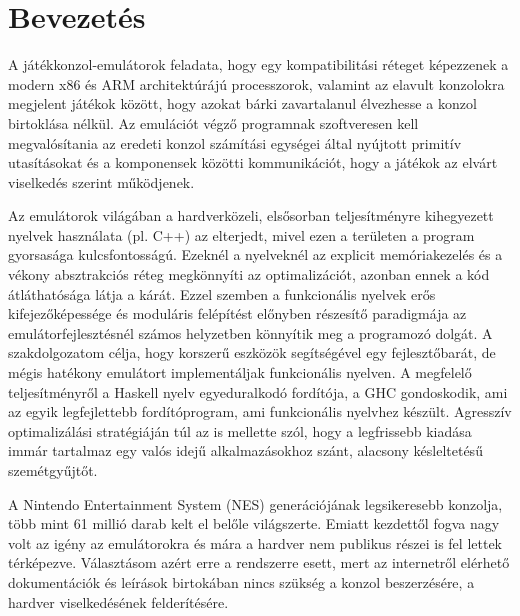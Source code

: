 \chapter{Bevezetés} %
\label{ch:intro}


A játékkonzol-emulátorok feladata, hogy egy kompatibilitási réteget képezzenek a modern x86 és ARM architektúrájú processzorok, valamint az elavult konzolokra megjelent játékok között, hogy azokat bárki zavartalanul élvezhesse a konzol birtoklása nélkül. Az emulációt végző programnak szoftveresen kell megvalósítania az eredeti konzol számítási egységei által nyújtott primitív utasításokat és a komponensek közötti kommunikációt, hogy a játékok az elvárt viselkedés szerint működjenek.

Az emulátorok világában a hardverközeli, elsősorban teljesítményre kihegyezett nyelvek használata (pl. C++) az elterjedt, mivel ezen a területen a program gyorsasága kulcsfontosságú. Ezeknél a nyelveknél az explicit memóriakezelés és a vékony absztrakciós réteg megkönnyíti az optimalizációt, azonban ennek a kód átláthatósága látja a kárát.
Ezzel szemben a funkcionális nyelvek erős kifejezőképessége és moduláris felépítést előnyben részesítő paradigmája az emulátorfejlesztésnél számos helyzetben könnyítik meg a programozó dolgát. A szakdolgozatom célja, hogy korszerű eszközök segítségével
egy fejlesztőbarát, de mégis hatékony emulátort implementáljak funkcionális nyelven. A megfelelő teljesítményről a Haskell nyelv egyeduralkodó fordítója, a GHC gondoskodik, ami az egyik legfejlettebb fordítóprogram, ami funkcionális nyelvhez készült. Agresszív optimalizálási stratégiáján túl az is mellette szól, hogy a legfrissebb kiadása immár tartalmaz egy valós idejű alkalmazásokhoz szánt, alacsony késleltetésű szemétgyűjtőt. 

A Nintendo Entertainment System (NES) generációjának legsikeresebb konzolja, több mint 61 millió darab kelt el belőle világszerte. Emiatt kezdettől fogva nagy volt az igény az emulátorokra és mára a hardver nem publikus részei is fel lettek térképezve. Választásom azért erre a rendszerre esett, mert az internetről elérhető dokumentációk és leírások birtokában nincs szükség a konzol beszerzésére, a hardver viselkedésének felderítésére.
